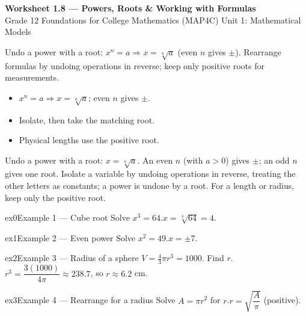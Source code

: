 \documentclass[11pt]{article}
\begin{document}
\begin{center}
{\LARGE\bfseries\color{titleblue}Worksheet 1.8 --- Powers, Roots \& Working with Formulas}\\[2pt]
{\small Grade 12 Foundations for College Mathematics (MAP4C) \textperiodcentered{} Unit 1: Mathematical Models}
\end{center}

\begin{ideabox}
Undo a power with a root: $x^{n}=a\Rightarrow x=\sqrt[n]{a}$ (even $n$ gives $\pm$). Rearrange formulas by undoing operations in reverse; keep only positive roots for measurements.
\begin{itemize}[leftmargin=*,itemsep=2pt]
  \item $x^{n}=a\Rightarrow x=\sqrt[n]{a}$; even $n$ gives $\pm$.
  \item Isolate, then take the matching root.
  \item Physical lengths use the positive root.
\end{itemize}
\end{ideabox}

\begin{learnbox}
Undo a power with a root: $x=\sqrt[n]{a}$. An even $n$ (with $a>0$) gives $\pm$; an odd $n$ gives one root.
Isolate a variable by undoing operations in reverse, treating the other letters as constants; a power is undone by a root.
For a length or radius, keep only the positive root.
\end{learnbox}


\begin{example}{ex0}{Example 1 --- Cube root}
Solve $x^{3}=64$.\soln $x=\sqrt[3]{64}=4$.
\end{example}

\begin{example}{ex1}{Example 2 --- Even power}
Solve $x^{2}=49$.\soln $x=\pm7$.
\end{example}

\begin{example}{ex2}{Example 3 --- Radius of a sphere}
$V=\tfrac43\pi r^{3}=1000$. Find $r$.\soln $r^3=\dfrac{3(1000)}{4\pi}\approx238.7$, so $r\approx6.2$ cm.
\end{example}

\begin{example}{ex3}{Example 4 --- Rearrange for a radius}
Solve $A=\pi r^{2}$ for $r$.\soln $r=\sqrt{\dfrac{A}{\pi}}$ (positive).
\end{example}
\end{document}
